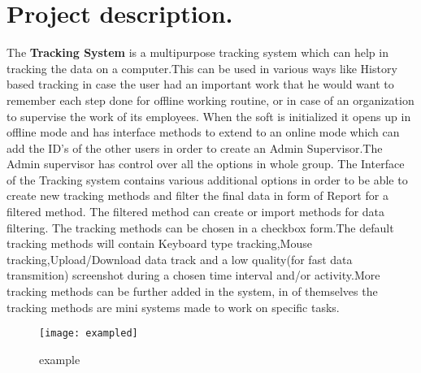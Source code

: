 \section{Project description.}
The \textbf{Tracking System} is a multipurpose tracking system which can help in tracking the data on a computer.This can be used in various ways like History based tracking in case the user had an important work that he would want to remember each step done for offline working routine, or in case of an organization to supervise the work of its employees. When the soft is initialized it opens up in offline mode and has interface methods to extend to an online mode which can add the ID’s of the other users in order to create an Admin Supervisor.The Admin supervisor has control over all the options in whole group. The Interface of the Tracking system contains various additional options in order to be able to create new tracking methods and filter the final data in form of Report for a filtered method.
The filtered method can create or import methods for data filtering. The tracking methods can be chosen in a checkbox form.The default tracking methods will contain Keyboard type tracking,Mouse tracking,Upload/Download data track and a low quality(for fast data transmition) screenshot during a chosen time interval and/or activity.More tracking methods can be further added in the system, in of themselves the tracking methods are mini systems made to work on specific tasks.
\begin{figure}[h!]
\centering
\texttt{[image: exampled]}
\caption{example} 
\end{figure}
\clearpage
